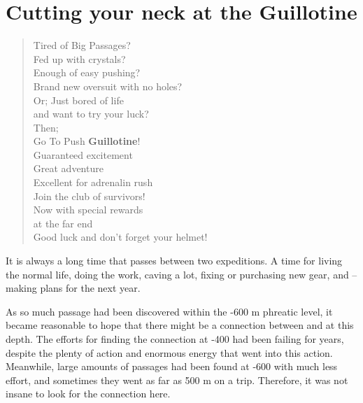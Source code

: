 \section{Cutting your neck at the Guillotine}


\begin{verse}
Tired of Big Passages? \\
Fed up with crystals? \\
Enough of easy pushing? \\
Brand new oversuit with no holes? \\

Or; Just bored of life \\
   and want to try your luck? \\

Then; \\ 

Go To Push \textbf{Guillotine}! \\

Guaranteed excitement \\
Great adventure \\
Excellent for adrenalin rush \\

Join the club of survivors! \\

Now with special rewards \\
at the far end \\

Good luck and don't forget your helmet!
\end{verse}




It is always a long time that passes between two expeditions. A time for
living the normal life, doing the work, caving a lot, fixing or
purchasing new gear, and -- making plans for the next year.

As so much passage had been discovered within the -600 m phreatic level,
it became reasonable to hope that there might be a connection between
 and  at this depth. The
efforts for finding the connection at -400 had been failing for years,
despite the plenty of action and enormous energy that went into this
action. Meanwhile, large amounts of passages had been found at -600 with
much less effort, and sometimes they went as far as 500 m on a trip.
Therefore, it was not insane to look for the connection here.

